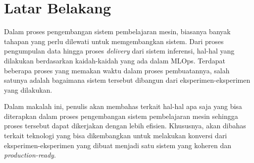 \section{Latar Belakang}

Dalam proses pengembangan sistem pembelajaran mesin, biasanya banyak tahapan yang perlu dilewati untuk memgembangkan sistem.
Dari proses pengumpulan data hingga proses \textit{delivery} dari sistem inferensi, hal-hal yang dilakukan berdasarkan kaidah-kaidah yang ada dalam MLOps.
Terdapat beberapa proses yang memakan waktu dalam proses pembuatannya, salah satunya adalah bagaimana sistem tersebut dibangun dari eksperimen-eksperimen yang dilakukan.

Dalam makalah ini, penulis akan membahas terkait hal-hal apa saja yang bisa diterapkan dalam proses pengembangan sistem pembelajaran mesin sehingga proses tersebut dapat dikerjakan dengan lebih efisien.
Khususnya, akan dibahas terkait teknologi yang bisa dikembangkan untuk melakukan konversi dari eksperimen-eksperimen yang dibuat menjadi satu sistem yang koheren dan \textit{production-ready}.